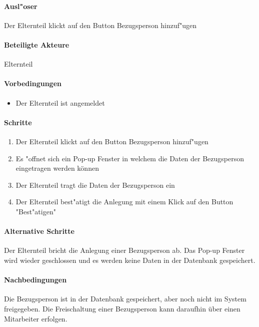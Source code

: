		\paragraph{Ausl"oser}
		Der Elternteil klickt auf den Button \dq Bezugsperson hinzuf"ugen\dq
		\paragraph{Beteiligte Akteure}   \leavevmode \newline
		Elternteil
		\paragraph{Vorbedingungen}
			\begin{itemize}
			 	\item Der Elternteil ist angemeldet
			\end{itemize}
		
		\paragraph{Schritte}
			\begin{enumerate}
			 	\item Der Elternteil klickt auf den Button \dq Bezugsperson hinzuf"ugen\dq
			 		\item Es "offnet sich ein Pop-up Fenster in welchem die Daten der Bezugsperson eingetragen werden können
			 	\item Der Elternteil tragt die Daten der Bezugsperson ein
			 	\item Der Elternteil best"atigt die Anlegung mit einem Klick auf den Button "Best"atigen"
			\end{enumerate}
		
		\paragraph{Alternative Schritte}
		Der Elternteil bricht die Anlegung einer Bezugsperson ab. Das Pop-up Fenster wird wieder geschlossen und es werden keine Daten in der Datenbank gespeichert. 	
		\paragraph{Nachbedingungen}
		Die Bezugsperson ist in der Datenbank gespeichert, aber noch nicht im System freigegeben. Die Freischaltung einer Bezugsperson kann daraufhin über einen Mitarbeiter erfolgen. 
		
		
		
